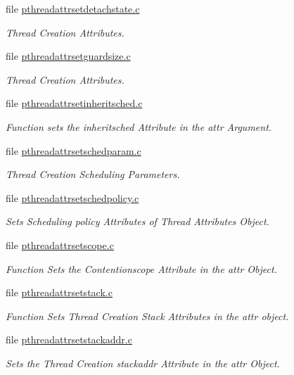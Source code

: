 \begin{DoxyCompactItemize}
file \mbox{\hyperlink{pthreadattrsetdetachstate_8c}{pthreadattrsetdetachstate.\+c}}
\begin{DoxyCompactList}\small\item\em Thread Creation Attributes. \end{DoxyCompactList}\item 
file \mbox{\hyperlink{pthreadattrsetguardsize_8c}{pthreadattrsetguardsize.\+c}}
\begin{DoxyCompactList}\small\item\em Thread Creation Attributes. \end{DoxyCompactList}\item 
file \mbox{\hyperlink{pthreadattrsetinheritsched_8c}{pthreadattrsetinheritsched.\+c}}
\begin{DoxyCompactList}\small\item\em Function sets the inheritsched Attribute in the attr Argument. \end{DoxyCompactList}\item 
file \mbox{\hyperlink{pthreadattrsetschedparam_8c}{pthreadattrsetschedparam.\+c}}
\begin{DoxyCompactList}\small\item\em Thread Creation Scheduling Parameters. \end{DoxyCompactList}\item 
file \mbox{\hyperlink{pthreadattrsetschedpolicy_8c}{pthreadattrsetschedpolicy.\+c}}
\begin{DoxyCompactList}\small\item\em Sets Scheduling policy Attributes of Thread Attributes Object. \end{DoxyCompactList}\item 
file \mbox{\hyperlink{pthreadattrsetscope_8c}{pthreadattrsetscope.\+c}}
\begin{DoxyCompactList}\small\item\em Function Sets the Contentionscope Attribute in the attr Object. \end{DoxyCompactList}\item 
file \mbox{\hyperlink{pthreadattrsetstack_8c}{pthreadattrsetstack.\+c}}
\begin{DoxyCompactList}\small\item\em Function Sets Thread Creation Stack Attributes in the attr object. \end{DoxyCompactList}\item 
file \mbox{\hyperlink{pthreadattrsetstackaddr_8c}{pthreadattrsetstackaddr.\+c}}
\begin{DoxyCompactList}\small\item\em Sets the Thread Creation stackaddr Attribute in the attr Object. \end{DoxyCompactList}\item 

\end{DoxyCompactItemize}
